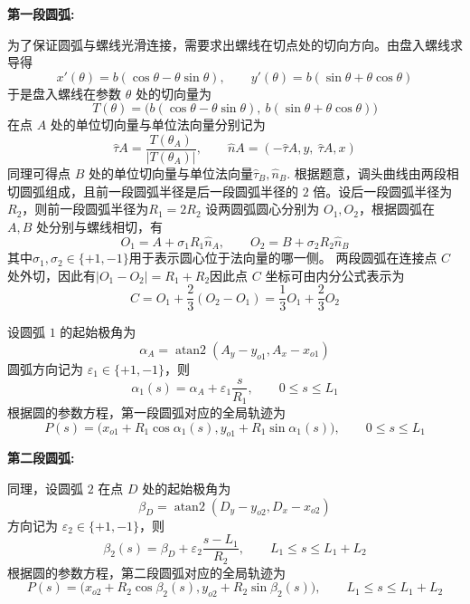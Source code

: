 \documentclass[UTF-8,a4paper,zihao=-4]{ctexart}
\begin{document}
\noindent\textbf{第一段圆弧:}

为了保证圆弧与螺线光滑连接，需要求出螺线在切点处的切向方向。由盘入螺线求导得
\begin{equation}
x'(\theta)=b(\cos\theta-\theta\sin\theta),\qquad y'(\theta)=b(\sin\theta+\theta\cos\theta)
\end{equation}
于是盘入螺线在参数 $\theta$ 处的切向量为
\begin{equation}
T(\theta)=\bigl(b(\cos\theta-\theta\sin\theta),\ b(\sin\theta+\theta\cos\theta)\bigr)
\end{equation}
在点 $A$ 处的单位切向量与单位法向量分别记为
\begin{equation}
\hat{\tau}A=\frac{T(\theta_A)}{|T(\theta_A)|},\qquad \hat{n}A=(-\hat{\tau}{A,y},\ \hat{\tau}{A,x})
\end{equation}
同理可得点 $B$ 处的单位切向量与单位法向量$\hat{\tau}_B,\hat{n}_B$.
根据题意，调头曲线由两段相切圆弧组成，且前一段圆弧半径是后一段圆弧半径的 $2$ 倍。设后一段圆弧半径为 $R_2$，则前一段圆弧半径为$R_1=2R_2$
设两圆弧圆心分别为 $O_1,O_2$，根据圆弧在 $A,B$ 处分别与螺线相切，有\begin{equation}
O_1=A+\sigma_1R_1\hat{n}_A,\qquad O_2=B+\sigma_2R_2\hat{n}_B
\end{equation}
其中$\sigma_1,\sigma_2\in\{+1,-1\}$用于表示圆心位于法向量的哪一侧。
两段圆弧在连接点 $C$ 处外切，因此有$|O_1-O_2|=R_1+R_2$因此点 $C$ 坐标可由内分公式表示为
\begin{equation}
C=O_1+\frac{2}{3}(O_2-O_1) =\frac13 O_1+\frac23 O_2
\end{equation}

设圆弧 $1$ 的起始极角为
\begin{equation}
\alpha_A=\operatorname{atan2}(A_y-y_{o1},A_x-x_{o1})
\end{equation}
圆弧方向记为 $\varepsilon_1\in\{+1,-1\}$，则
\begin{equation}
\alpha_1(s)=\alpha_A+\varepsilon_1\frac{s}{R_1}, \qquad 0\le s\le L_1
\end{equation}
根据圆的参数方程，第一段圆弧对应的全局轨迹为
\begin{equation}
P(s)= \bigl( x_{o1}+R_1\cos\alpha_1(s),
y_{o1}+R_1\sin\alpha_1(s) \bigr), \qquad 0\le s\le L_1
\end{equation}

\noindent\textbf{第二段圆弧:}

同理，设圆弧 $2$ 在点 $D$ 处的起始极角为
\begin{equation}
\beta_D=\operatorname{atan2}(D_y-y_{o2},D_x-x_{o2})
\end{equation}
方向记为 $\varepsilon_2\in\{+1,-1\}$，则
\begin{equation}
\beta_2(s)=\beta_D+\varepsilon_2\frac{s-L_1}{R_2}, \qquad L_1\le s\le L_1+L_2
\end{equation}
根据圆的参数方程，第二段圆弧对应的全局轨迹为
\begin{equation}
P(s)= \bigl( x_{o2}+R_2\cos\beta_2(s),
y_{o2}+R_2\sin\beta_2(s) \bigr), \qquad L_1\le s\le L_1+L_2
\end{equation}
\end{document}
